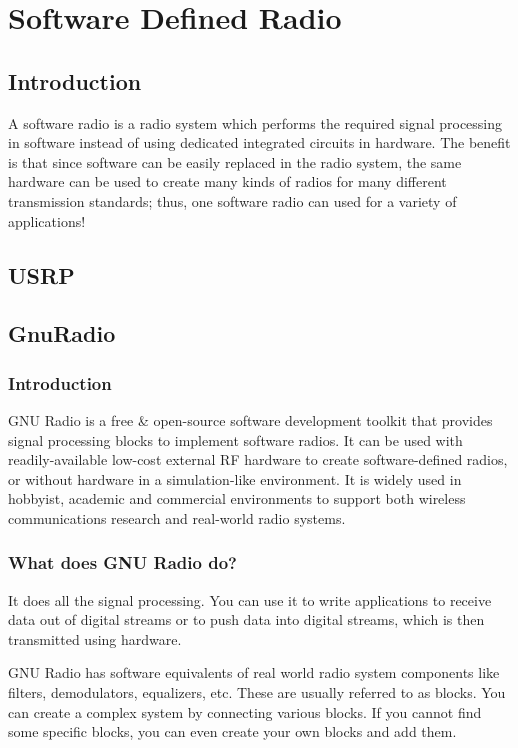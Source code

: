 \chapter{Software Defined Radio}


\section{Introduction}
A software radio is a radio system which performs the required signal processing in software instead of using dedicated integrated circuits in hardware. The benefit is that since software can be easily replaced in the radio system, the same hardware can be used to create many kinds of radios for many different transmission standards; thus, one software radio can used for a variety of applications!


\section{USRP}


\section{GnuRadio}

\subsection{Introduction}
GNU Radio is a free \& open-source software development toolkit that provides signal processing blocks to implement software radios. It can be used with readily-available low-cost external RF hardware to create software-defined radios, or without hardware in a simulation-like environment. It is widely used in hobbyist, academic and commercial environments to support both wireless communications research and real-world radio systems.

\subsection{What does GNU Radio do?}
It does all the signal processing. You can use it to write applications to receive data out of digital streams or to push data into digital streams, which is then transmitted using hardware.

GNU Radio has software equivalents of real world radio system components like filters, demodulators, equalizers, etc. These are usually referred to as blocks. You can create a complex system by connecting various blocks. If you cannot find some specific blocks, you can even create your own blocks and add them.

